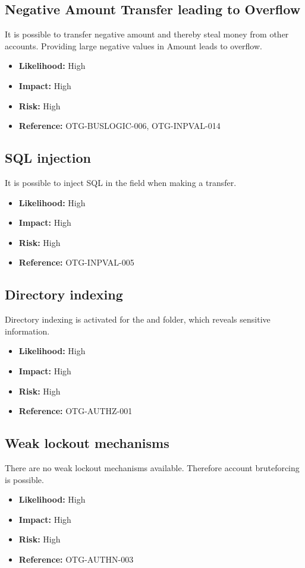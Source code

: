 \subsection{Negative Amount Transfer leading to Overflow}
It is possible to transfer negative amount and thereby steal money from other accounts.
Providing large negative values in Amount leads to overflow.
\begin{itemize}
	\item \textbf{Likelihood:} High
	\item \textbf{Impact:} High
	\item \textbf{Risk:} High
	\item \textbf{Reference:} OTG-BUSLOGIC-006, OTG-INPVAL-014
\end{itemize}

\subsection{SQL injection}
It is possible to inject SQL in the field  when making a transfer.
\begin{itemize}
	\item \textbf{Likelihood:} High
	\item \textbf{Impact:} High
	\item \textbf{Risk:} High
	\item \textbf{Reference:} OTG-INPVAL-005
\end{itemize}

\subsection{Directory indexing}
Directory indexing is activated for the  and  folder, which reveals sensitive information.
\begin{itemize}
	\item \textbf{Likelihood:} High
	\item \textbf{Impact:} High
	\item \textbf{Risk:} High
	\item \textbf{Reference:} OTG-AUTHZ-001
\end{itemize}

\subsection{Weak lockout mechanisms}
There are no weak lockout mechanisms available. Therefore account bruteforcing is possible.
\begin{itemize}
	\item \textbf{Likelihood:} High
	\item \textbf{Impact:} High
	\item \textbf{Risk:} High
	\item \textbf{Reference:} OTG-AUTHN-003
\end{itemize}

